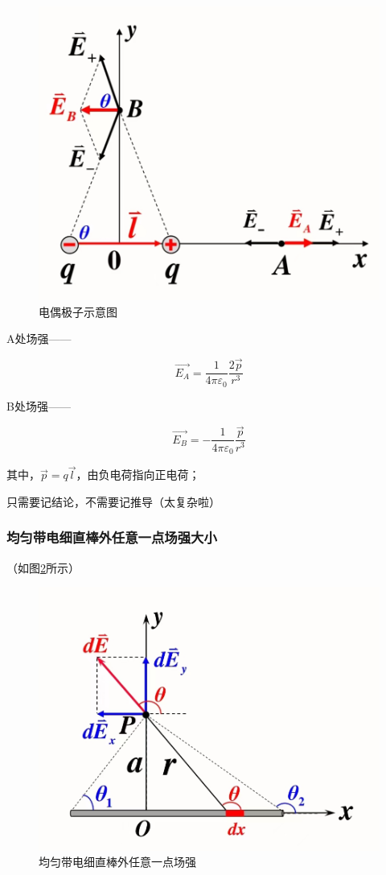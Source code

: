 \documentclass{ctexart}
\begin{document}
\begin{figure}[h]
	\centering
	\includegraphics[scale=0.2]{images//chapter_10//figure_10.1.jpg} 
	\caption{电偶极子示意图}\label{figure1}
\end{figure}

A处场强——

$$\vec{E_A}=\frac{1}{4\pi \varepsilon_0}\frac{2\vec{p}}{r^3}$$

B处场强——

$$\vec{E_B}=-\frac{1}{4\pi \varepsilon_0}\frac{\vec{p}}{r^3}$$

其中，$\vec{p}=q\vec{l}$，由负电荷指向正电荷；

只需要记结论，不需要记推导（太复杂啦）

\subsubsection{均匀带电细直棒外任意一点场强大小}

（如图\ref{figure2}所示）

\begin{figure}[h]
	\centering
	\includegraphics[scale=0.2]{images//chapter_10//figure_10.2.jpg} 
	\caption{均匀带电细直棒外任意一点场强}\label{figure2}
\end{figure}
\end{document}
